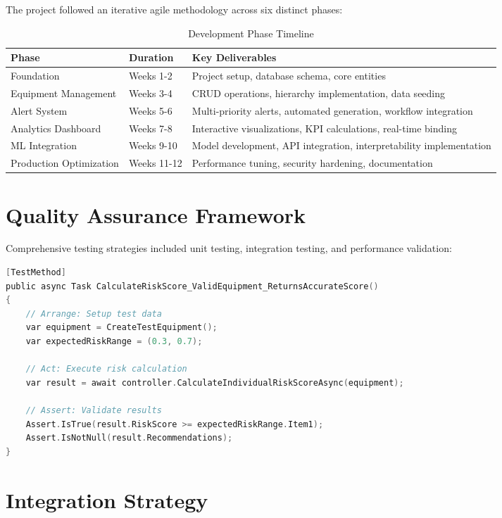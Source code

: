 \documentclass[12pt,a4paper]{report}
\begin{document}
The project followed an iterative agile methodology across six distinct phases:

\begin{table}[H]
\centering
\caption{Development Phase Timeline}
\begin{tabular}{|l|l|p{8cm}|}
\hline
\textbf{Phase} & \textbf{Duration} & \textbf{Key Deliverables} \\
\hline
Foundation & Weeks 1-2 & Project setup, database schema, core entities \\
\hline
Equipment Management & Weeks 3-4 & CRUD operations, hierarchy implementation, data seeding \\
\hline
Alert System & Weeks 5-6 & Multi-priority alerts, automated generation, workflow integration \\
\hline
Analytics Dashboard & Weeks 7-8 & Interactive visualizations, KPI calculations, real-time binding \\
\hline
ML Integration & Weeks 9-10 & Model development, API integration, interpretability implementation \\
\hline
Production Optimization & Weeks 11-12 & Performance tuning, security hardening, documentation \\
\hline
\end{tabular}
\end{table}

\section{Quality Assurance Framework}

Comprehensive testing strategies included unit testing, integration testing, and performance validation:

\begin{lstlisting}[language=C, caption=Unit Testing Example]
[TestMethod]
public async Task CalculateRiskScore_ValidEquipment_ReturnsAccurateScore()
{
    // Arrange: Setup test data
    var equipment = CreateTestEquipment();
    var expectedRiskRange = (0.3, 0.7);
    
    // Act: Execute risk calculation
    var result = await controller.CalculateIndividualRiskScoreAsync(equipment);
    
    // Assert: Validate results
    Assert.IsTrue(result.RiskScore >= expectedRiskRange.Item1);
    Assert.IsNotNull(result.Recommendations);
}
\end{lstlisting}

\section{Integration Strategy}
\end{document}
